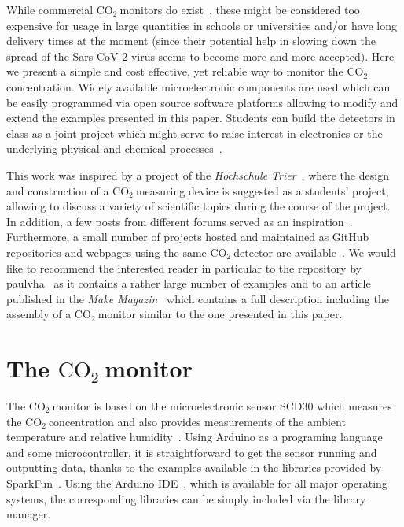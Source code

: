 \documentclass[12pt,a4paper]{article}
\newcommand{\coo}{\ensuremath{\mathrm{CO_2}~}}
\begin{document}
While commercial \coo monitors do exist~\cite{ARANET2020,TFA2020,WOEHLER2020}, these might be considered too expensive for usage in large quantities in schools or universities and/or have long delivery times at the moment (since their potential help in slowing down the spread of the Sars-CoV-2 virus seems to become more and more accepted). Here we present a simple and cost effective, yet reliable way to monitor the \coo concentration. Widely available microelectronic components are used which can be easily programmed via open source software platforms allowing to modify and extend the examples presented in this paper. Students can build the detectors in class as a joint project which might serve to raise interest in electronics or the underlying physical and chemical processes~\cite{WATZKA2011}. 

This work was inspired by a project of the \textit{Hochschule Trier}~\cite{BIRKENFELD2020}, where the design and construction of a \coo measuring device is suggested as a students' project, allowing to discuss a variety of scientific topics during the course of the project. In addition, a few posts from different forums served as an inspiration~\cite{BOYLES2020,METROPOL2020,OMBRA2020,ZENTRIS2020}. Furthermore, a small number of projects hosted and maintained as GitHub repositories and webpages using the same \coo detector are available~\cite{MKETZ2020,NETZBASTELN2020,PAULVHA2020,RUHE2020}. We would like to recommend the interested reader in particular to the repository by paulvha~\cite{PAULVHA2020} as it contains a rather large number of examples and to an article published in the \textit{Make Magazin}~\cite{MAKEMAGAZIN2020} which contains a full description including the assembly of a \coo monitor similar to the one presented in this paper.


\section{The \coo monitor}
The \coo monitor is based on the microelectronic sensor SCD30 which measures the \coo concentration and also provides measurements of the ambient temperature and relative humidity~\cite{SENSIRION2020B}. Using Arduino as a programing language and some microcontroller, it is straightforward to get the sensor running and outputting data, thanks to the examples available in the libraries provided by SparkFun~\cite{SPARKFUN2020}. Using the Arduino IDE~\cite{ARDUINOIDE2020}, which is available for all major operating systems, the corresponding libraries can be simply included via the library manager. 
\end{document}
